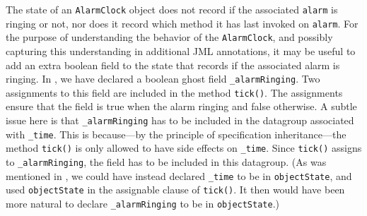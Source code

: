 \documentclass{llncs}
\begin{document}
The state of an \texttt{AlarmClock} object does not record if the associated
\texttt{alarm} is ringing or not, nor 
does it record which method it has last invoked on \texttt{alarm}.
For the purpose of understanding the behavior of the \texttt{AlarmClock}, 
and possibly capturing this understanding in additional JML annotations,
it may be useful to add an extra boolean field to the state that records if 
the associated alarm is ringing.
%
In , we have declared 
a boolean ghost field \texttt{\_alarmRinging}.
Two assignments to this field are included in the method \texttt{tick()}.
The assignments ensure that the field is true when the alarm ringing and false
otherwise.
%
A subtle issue here is that \texttt{\_alarmRinging} has to be
  included in the datagroup associated with \texttt{\_time}. This is
  because---by the principle of specification inheritance---the method
  \texttt{tick()} is only allowed to have side effects on \texttt{\_time}.
  Since \texttt{tick()} assigns to \texttt{\_alarmRinging}, the field
  has to be included in this datagroup.  
%
  (As was mentioned in , we could have instead declared
  \texttt{\_time} to be in \texttt{objectState}, and used 
  \texttt{objectState} in the assignable clause of \texttt{tick()}.  It then
  would have been more natural to declare \texttt{\_alarmRinging} to be in
  \texttt{objectState}.)

% 
\end{document}
